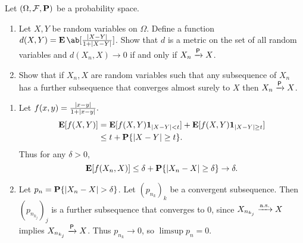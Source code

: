 \documentclass[12pt]{article}
\begin{document}
\begin{problem*}
    Let $(\Omega, \mathcal{F}, \operatorname{\mathbf P})$ be a probability space.
    \begin{enumerate}
        \item Let $X, Y$ be random variables on $\Omega$.
        Define a function $d(X, Y) = \E\ab[\frac{\abs{X-Y}}{1+\abs{X-Y}}]$.
        Show that $d$ is a metric on the set of all random variables and
        $d(X_n, X) \to 0$ if and only if $X_n \xrightarrow{\mathsf{P}} X$.
        \item Show that if $X_n, X$ are random variables such that any
        subsequence of $X_n$ has a further subsequence that converges almost
        surely to $X$ then $X_n \xrightarrow{\mathsf{P}} X$.
    \end{enumerate}
\end{problem*}
\begin{solution} \leavevmode
    \begin{enumerate}
        \item Let $f(x, y) = \frac{\lvert x-y\rvert}{1+\lvert x-y\rvert}. $\begin{align*}
            \operatorname{\mathbf E}[f(X, Y)] &= \operatorname{\mathbf E}[f(X, Y) \bm{1}_{\lvert X - Y\rvert < t}]
                + \operatorname{\mathbf E}[f(X, Y) \bm{1}_{\lvert X - Y\rvert \ge t}] \\
                &\le t + \operatorname{\mathbf P}\{\lvert X - Y\rvert \ge t\}.
        \end{align*}
        Thus for any $\delta > 0$, \[
            \operatorname{\mathbf E}[f(X_n, X)]
                \le \delta + \operatorname{\mathbf P}\{\lvert X_n - X\rvert \ge \delta\} \to \delta.
        \]
        \item Let $p_n = \operatorname{\mathbf P}\{\lvert X_n - X\rvert > \delta\}$.
        Let $(p_{n_k})_k$ be a convergent subsequence.
        Then $(p_{n_{k_j}})_j$ is a further subsequence that converges to
        $0$, since $X_{n_{k_j}} \xrightarrow{\text{a.s.}} X$ implies $X_{n_{k_j}} \xrightarrow{\mathsf{P}} X$.
        Thus $p_{n_k} \to 0$, so $\limsup p_n = 0$. \qedhere
    \end{enumerate}
\end{solution}
\end{document}
